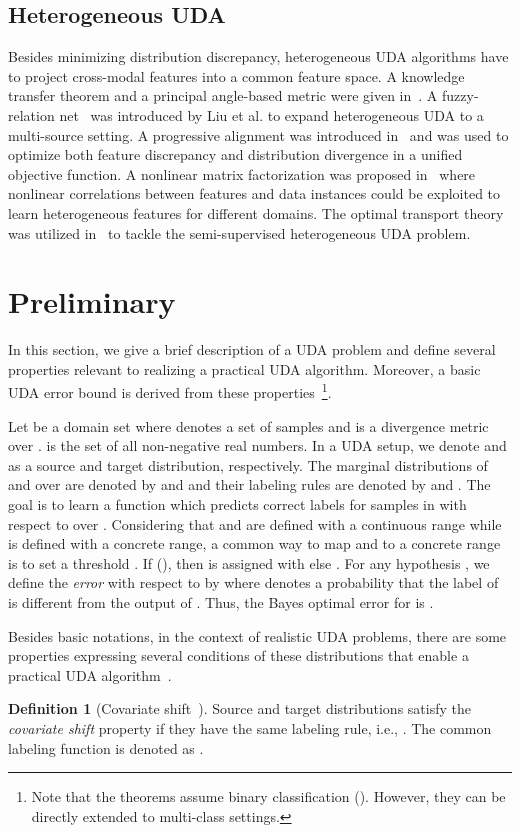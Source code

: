\documentclass[journal,twocolumn]{IEEEtran}
\theoremstyle{definition}
\newtheorem{definition}{Definition}
\begin{document}
\subsection{Heterogeneous UDA}
Besides minimizing distribution discrepancy, heterogeneous UDA algorithms have to project cross-modal features into a common feature space. A knowledge transfer theorem and a principal angle-based metric were given in~\cite{9023553}. A fuzzy-relation net~\cite{9172137} was introduced by Liu et al. to expand heterogeneous UDA  to a multi-source setting. A progressive alignment was introduced in~\cite{8475006} and was used to optimize both feature discrepancy and distribution divergence in a unified objective function. A nonlinear matrix factorization was proposed in~\cite{8725935} where nonlinear correlations between features and data instances could be exploited to learn heterogeneous features for different domains. The optimal transport theory was utilized in~\cite{ijcai2018-412} to tackle the semi-supervised  heterogeneous UDA problem.

\section{Preliminary}
\label{prelinary}
In this section, we give a brief description of a UDA problem and define several properties relevant to realizing  a practical UDA algorithm. Moreover, a basic UDA error bound is derived from these properties~\cite{Ben-David2014}\footnote {Note that the theorems assume binary classification (). However, they can be directly extended to multi-class settings.}. 

Let  be a domain set where  denotes a set of samples and  is a divergence metric over .  is the set of all non-negative real numbers. In a UDA setup, we denote  and  as a source and target distribution, respectively. The marginal distributions of  and  over  are denoted by  and  and their labeling rules are denoted by  and . The goal is to learn a function  which predicts correct labels for samples in  with respect to  over . Considering that  and  are defined with a continuous range while  is defined with a concrete range, a common way to map  and  to a concrete range is to set a threshold . If  (), then  is assigned with  else .   For any hypothesis , we define the \textit{error} with respect to  by  where  denotes a probability that the label of  is different from the output of . Thus, the Bayes optimal error for  is .

Besides basic notations, in the context of realistic UDA problems, there are some properties expressing several conditions of these distributions that enable a practical UDA algorithm~\cite{Ben-David2014}.
\begin{definition}[Covariate shift~\cite{Sugiyama05generalizationerror}]
Source and target distributions satisfy the \textit{covariate shift} property if they have the same labeling rule, i.e., . The common labeling function is denoted as .
\label{def1}
\end{definition}
 
\end{document}
